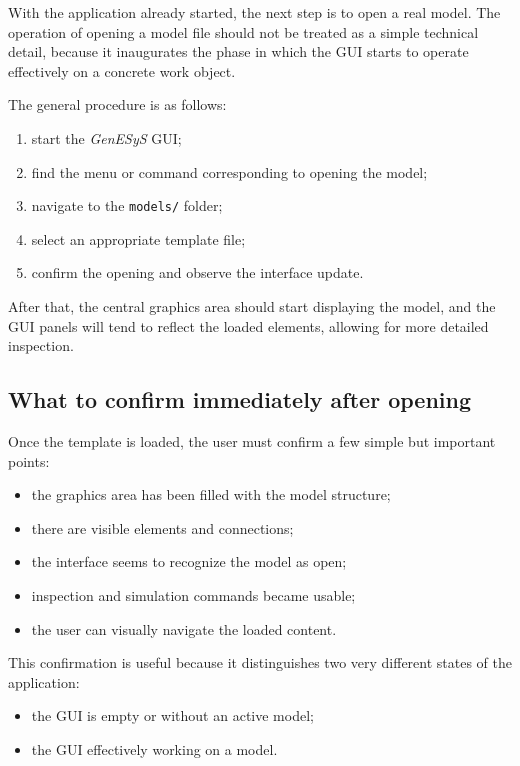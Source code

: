 With the application already started, the next step is to open a real model. The operation of opening a model file should not be treated as a simple technical detail, because it inaugurates the phase in which the GUI starts to operate effectively on a concrete work object.

The general procedure is as follows:
\begin{enumerate}
\item start the \textit{GenESyS} GUI;
\item find the menu or command corresponding to opening the model;
\item navigate to the \texttt{models/} folder;
\item select an appropriate template file;
\item confirm the opening and observe the interface update.
\end{enumerate}

After that, the central graphics area should start displaying the model, and the GUI panels will tend to reflect the loaded elements, allowing for more detailed inspection.

\subsection{What to confirm immediately after opening}
\label{subsec:cap4_confirmar_apos_abertura}

Once the template is loaded, the user must confirm a few simple but important points:

\begin{itemize}
\item the graphics area has been filled with the model structure;
\item there are visible elements and connections;
\item the interface seems to recognize the model as open;
\item inspection and simulation commands became usable;
\item the user can visually navigate the loaded content.
\end{itemize}

This confirmation is useful because it distinguishes two very different states of the application:
\begin{itemize}
\item the GUI is empty or without an active model;
\item the GUI effectively working on a model.
\end{itemize}


